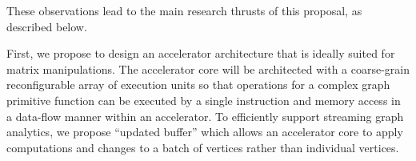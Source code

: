 

These observations lead to the main research thrusts of this proposal, as described below.

First, we propose to design an accelerator architecture that is ideally suited for matrix manipulations. 
The accelerator core will be architected with a coarse-grain reconfigurable array of execution units so that operations for a complex graph primitive function can be executed by a single instruction and memory access in a data-flow manner within an accelerator. 
To efficiently support streaming graph analytics, we propose ``updated buffer'' which allows an accelerator core to apply computations and changes to a batch of vertices rather than individual vertices. 

